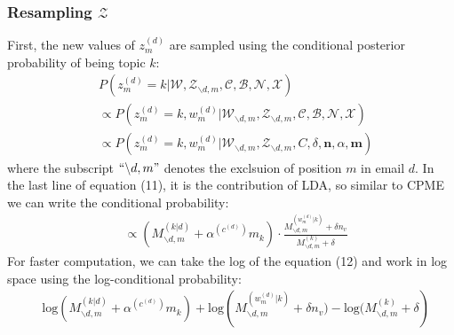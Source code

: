 \documentclass[a4paper]{article}
\begin{document}
\subsubsection{Resampling $\mathcal{Z}$}
First, the new values of $z^{(d)}_m$ are sampled using the conditional posterior probability of being topic $k$:
\begin{equation}
\begin{aligned} & P(z^{(d)}_m=k|\mathcal{W}, \mathcal{Z}_{\backslash d,m}, \mathcal{C}, \mathcal{B}, \mathcal{N}, \mathcal{X})\\ &\propto P(z^{(d)}_m=k, w^{(d)}_m|\mathcal{W}_{\backslash d, m}, \mathcal{Z}_{\backslash d,m}, \mathcal{C}, \mathcal{B}, \mathcal{N}, \mathcal{X})\\
& \propto P(z^{(d)}_m=k, w^{(d)}_m|\mathcal{W}_{\backslash d, m}, \mathcal{Z}_{\backslash d,m}, C, \delta, \boldsymbol{n}, \alpha, \boldsymbol{m})
\end{aligned}
\end{equation}
where the subscript $``{\backslash d, m}"$ denotes the exclsuion of position $m$ in email $d$. In the last line of equation (11), it is the contribution of LDA, so similar to CPME we can write the conditional probability:
	\begin{equation}
	\begin{aligned} 
	& \propto ({M}^{(k|d)}_{\backslash d, m}+\alpha^{(c^{(d)})}m_k)\cdot \frac{{M}^{(w_m^{(d)}|k)}_{\backslash d, m}+\delta n_v}{{M}^{(k)}_{\backslash d, m}+\delta}
	\end{aligned}
	\end{equation}
\newline 
	For faster computation, we can take the log of the equation (12) and work in log space using the log-conditional probability:
		\begin{equation}
		\begin{aligned} 
		& \mbox{log}({M}^{(k|d)}_{\backslash d, m}+\alpha^{(c^{(d)})}m_k)+\mbox{log}( {{M}^{(w_m^{(d)}|k)}_{\backslash d, m}+\delta n_v)-\mbox{log}({M}^{(k)}_{\backslash d, m}+\delta}) 
		\end{aligned}
		\end{equation}
\end{document}
